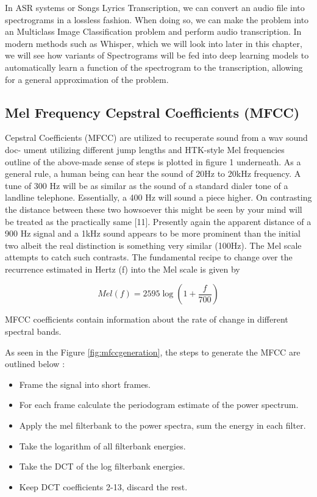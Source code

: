 In ASR systems or Songs Lyrics Transcription, we can convert an audio file into spectrograms in a lossless fashion. When doing so, we can make the problem into an Multiclass Image Classification problem and perform audio transcription. In modern methods such as Whisper, which we will look into later in this chapter, we will see how variants of Spectrograms will be fed into deep learning models to automatically learn a function of the spectrogram to the transcription, allowing for a general approximation of the problem. 

\subsection{Mel Frequency Cepstral Coefficients (MFCC)}%
\label{sec:mfcc}

Cepstral Coefficients (MFCC) are utilized to recuperate sound from a wav sound doc-
ument utilizing different jump lengths and HTK-style Mel frequencies outline of the
above-made sense of steps is plotted in figure 1 underneath. As a general rule, a human
being can hear the sound of 20Hz to 20kHz frequency. A tune of 300 Hz will be as similar
as the sound of a standard dialer tone of a landline telephone. Essentially, a 400 Hz will
sound a piece higher. On contrasting the distance between these two howsoever this
might be seen by your mind will be treated as the practically same [11]. Presently again
the apparent distance of a 900 Hz signal and a 1kHz sound appears to be more prominent
than the initial two albeit the real distinction is something very similar (100Hz). The
Mel scale attempts to catch such contrasts. The fundamental recipe to change over the
recurrence estimated in Hertz (f) into the Mel scale is given by 

\begin{equation}
{Mel}(f)=2595 \log \left(1+\frac{f}{700}\right)
\end{equation}

MFCC coefficients contain information about the rate of change in different spectral bands.


As seen in the Figure \ref{fig:mfccgeneration}, the steps to generate the MFCC are outlined below \cite{huang2001spoken}: 
\begin{itemize}
    \item Frame the signal into short frames.
    \item For each frame calculate the periodogram estimate of the power spectrum.
    \item Apply the mel filterbank to the power spectra, sum the energy in each filter.
    \item Take the logarithm of all filterbank energies.
    \item Take the DCT of the log filterbank energies.
    \item Keep DCT coefficients 2-13, discard the rest.
\end{itemize}

